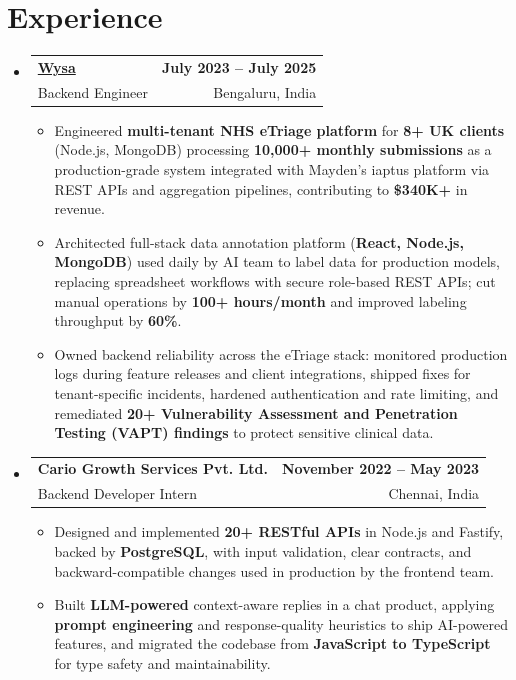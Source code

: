 \documentclass[letterpaper,10pt]{article}
\makeatletter
\newcommand{\resumeItem}[1]{
  \item\small{#1\vspace{-1pt}}
}
\newcommand{\resumeSubheading}[4]{
  \vspace{1pt}\item
    \begin{tabular*}{0.985\textwidth}[t]{l@{\extracolsep{\fill}}r}
      \textbf{#1} & \textbf{\small #2} \\
      {\small\color{ResumeSlate} #3} & {\small\color{ResumeSlate} #4} \\
    \end{tabular*}\vspace{-6pt}
}
\newcommand{\resumeSubHeadingListStart}{\begin{itemize}[leftmargin=0.0in, label={}, itemsep=2pt, topsep=2pt]}
\newcommand{\resumeSubHeadingListEnd}{\end{itemize}}
\newcommand{\resumeItemListStart}{\begin{itemize}[leftmargin=0.18in, itemsep=2pt, topsep=1pt]}
\newcommand{\resumeItemListEnd}{\end{itemize}\vspace{-4pt}}
\makeatother
\begin{document}
\section{Experience}
\resumeSubHeadingListStart
  \resumeSubheading
    {\href{https://www.wysa.io}{Wysa}}{July 2023 -- July 2025}
    {Backend Engineer}{Bengaluru, India}
    \resumeItemListStart
      \resumeItem{Engineered \textbf{multi-tenant NHS eTriage platform} for \textbf{8+ UK clients} (Node.js, MongoDB) processing \textbf{10{,}000+ monthly submissions} as a production-grade system integrated with Mayden's iaptus platform via REST APIs and aggregation pipelines, contributing to \textbf{\$340K+} in revenue.}
      \resumeItem{Architected full-stack data annotation platform (\textbf{React, Node.js, MongoDB}) used daily by AI team to label data for production models, replacing spreadsheet workflows with secure role-based REST APIs; cut manual operations by \textbf{100+ hours/month} and improved labeling throughput by \textbf{60\%}.}
      \resumeItem{Owned backend reliability across the eTriage stack: monitored production logs during feature releases and client integrations, shipped fixes for tenant-specific incidents, hardened authentication and rate limiting, and remediated \textbf{20+ Vulnerability Assessment and Penetration Testing (VAPT) findings} to protect sensitive clinical data.}
    \resumeItemListEnd
  \resumeSubheading
    {Cario Growth Services Pvt. Ltd.}{November 2022 -- May 2023}
    {Backend Developer Intern}{Chennai, India}
    \resumeItemListStart
      \resumeItem{Designed and implemented \textbf{20+ RESTful APIs} in Node.js and Fastify, backed by \textbf{PostgreSQL}, with input validation, clear contracts, and backward-compatible changes used in production by the frontend team.}
      \resumeItem{Built \textbf{LLM-powered} context-aware replies in a chat product, applying \textbf{prompt engineering} and response-quality heuristics to ship AI-powered features, and migrated the codebase from \textbf{JavaScript to TypeScript} for type safety and maintainability.}
    \resumeItemListEnd
\resumeSubHeadingListEnd
\vspace{-4pt}
\end{document}
